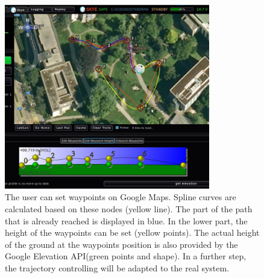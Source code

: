 \begin{figure}[H] %
	\begin{center}
		\includegraphics[width=0.8\textwidth]{qgc_automatic_control}
		\caption[Automatic control view of Graphical User Interface]{The user can set waypoints on Google Maps. Spline curves are calculated based on these nodes (yellow line). The part of the path that is already reached is displayed in blue. In the lower part, the height of the waypoints  can be set (yellow points). The actual height of the ground at the waypoints position is also provided by the Google Elevation API\footnotemark (green points and shape). In a further step, the trajectory controlling will be adapted to the real system.}  
		\label{figure:qgc_automatic_control}		
	\end{center}
\end{figure}
